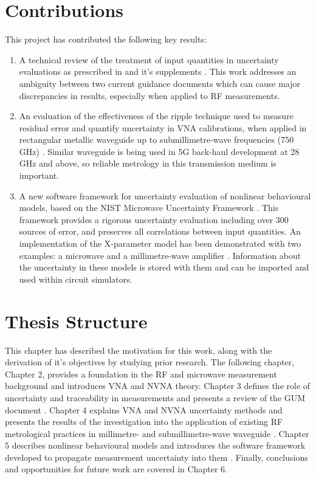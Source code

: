 \documentclass[../thesis/thesis.tex]{subfiles}
\begin{document}
\section{Contributions}
This project has contributed the following key results:
\begin{enumerate}
	\item A technical review \cite{Stant_2016} of the treatment of input quantities in uncertainty evaluations as prescribed in \cite{GUM_2008} and it's supplements \cite{GUM_S1,GUM_S2}. This work addresses an ambiguity between two current guidance documents which can cause major discrepancies in results, especially when applied to RF measurements.
	\item An evaluation of the effectiveness of the ripple technique used to measure residual error and quantify uncertainty in VNA calibrations, when applied in rectangular metallic waveguide up to submillimetre-wave frequencies (750 GHz) \cite{Stant_2017}. Similar waveguide is being used in 5G back-haul development at 28 GHz and above, so reliable metrology in this transmission medium is important.
	\item A new software framework for uncertainty evaluation of nonlinear behavioural models, based on the NIST Microwave Uncertainty Framework \cite{MUFWebsite}. This framework provides a rigorous uncertainty evaluation including over 300 sources of error, and preserves all correlations between input quantities. An implementation of the X-parameter model has been demonstrated with two examples: a microwave and a millimetre-wave amplifier \cite{Stant_2018_TMTT}. Information about the uncertainty in these models is stored with them and can be imported and used within circuit simulators.
\end{enumerate}

\section{Thesis Structure}
This chapter has described the motivation for this work, along with the derivation of it's objectives by studying prior research. The following chapter, Chapter 2, provides a foundation in the RF and microwave measurement background and introduces VNA and NVNA theory. Chapter 3 defines the role of uncertainty and traceability in measurements and presents a review of the GUM document \cite{Stant_2016}. Chapter 4 explains VNA and NVNA uncertainty methods and presents the results of the investigation into the application of existing RF metrological practices in millimetre- and submillimetre-wave waveguide \cite{Stant_2017}. Chapter 5 describes nonlinear behavioural models and introduces the software framework developed to propagate measurement uncertainty into them \cite{Stant_2018_TMTT}. Finally, conclusions and opportunities for future work are covered in Chapter 6.

\end{document}
